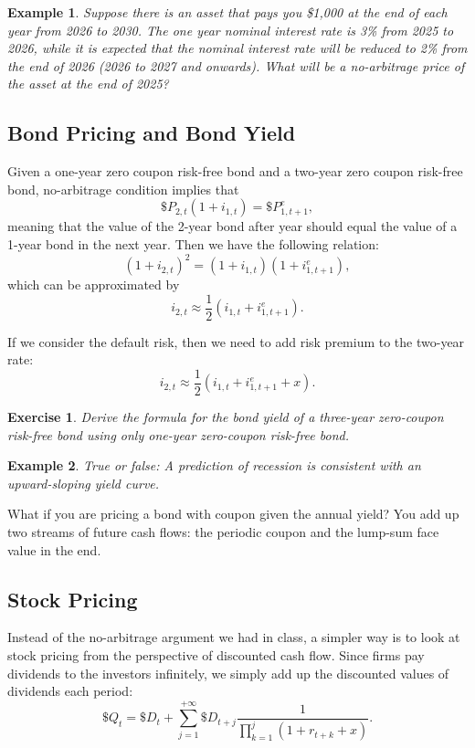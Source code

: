 \documentclass[12pt]{article}
\newtheorem{example}{Example}
\newtheorem{exercise}{Exercise}
\begin{document}
\begin{example}
    Suppose there is an asset that pays you \$1,000 at the end of each year from 2026 to 2030. The one year nominal interest rate is 3\% from 2025 to 2026, while it is expected that the nominal interest rate will be reduced to 2\% from the end of 2026 (2026 to 2027 and onwards). What will be a no-arbitrage price of the asset at the end of 2025?
\end{example}

\subsection*{Bond Pricing and Bond Yield}
Given a one-year zero coupon risk-free bond and a two-year zero coupon risk-free bond, no-arbitrage condition implies that
\[\$P_{2,t} (1 + i_{1,t}) = \$P_{1, t+1}^e,\]
meaning that the value of the 2-year bond after year should equal the value of a 1-year bond in the next year. Then we have the following relation:
\[(1 + i_{2,t})^2 = (1 + i_{1,t})(1 + i_{1, t+1}^e),\]
which can be approximated by
\[ i_{2,t} \approx \frac{1}{2}(i_{1,t} + i_{1, t+1}^e).\]

If we consider the default risk, then we need to add risk premium to the two-year rate:
\[ i_{2,t} \approx \frac{1}{2}(i_{1,t} + i_{1, t+1}^e + x).\]

\begin{exercise}
    Derive the formula for the bond yield of a three-year zero-coupon risk-free bond using only one-year zero-coupon risk-free bond.
\end{exercise}

\begin{example}
    True or false: A prediction of recession is consistent with an upward-sloping yield curve.
\end{example}

What if you are pricing a bond with coupon given the annual yield? You add up two streams of future cash flows: the periodic coupon and the lump-sum face value in the end.

\subsection*{Stock Pricing}
Instead of the no-arbitrage argument we had in class, a simpler way is to look at stock pricing from the perspective of discounted cash flow. Since firms pay dividends to the investors infinitely, we simply add up the discounted values of dividends each period:
\[ \$Q_t = \$D_t + \sum_{j=1}^{+\infty} \$D_{t+j} \frac{1}{\prod_{k=1}^j(1+r_{t+k} + x)}. \]
\end{document}
